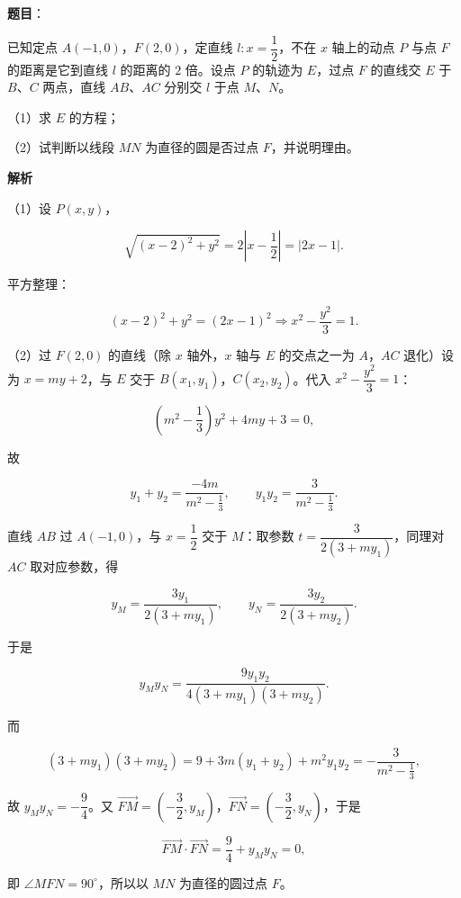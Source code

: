 \begin{answer}

\textbf{题目}：

已知定点 $A(-1,0)$，$F(2,0)$，定直线 $l:x=\dfrac12$，不在 $x$ 轴上的动点 $P$ 与点 $F$ 的距离是它到直线 $l$ 的距离的 $2$ 倍。设点 $P$ 的轨迹为 $E$，过点 $F$ 的直线交 $E$ 于 $B$、$C$ 两点，直线 $AB$、$AC$ 分别交 $l$ 于点 $M$、$N$。

（1）求 $E$ 的方程；

（2）试判断以线段 $MN$ 为直径的圆是否过点 $F$，并说明理由。

\textbf{解析}

（1）设 $P(x,y)$，

\nopagebreak[4]
\[\sqrt{(x-2)^2+y^2}=2\left|x-\frac12\right|=|2x-1|.\]

平方整理：

\nopagebreak[4]
\[(x-2)^2+y^2=(2x-1)^2
\Longrightarrow x^2-\frac{y^2}3=1.\]

（2）过 $F(2,0)$ 的直线（除 $x$ 轴外，$x$ 轴与 $E$ 的交点之一为 $A$，$AC$ 退化）设为 $x=my+2$，与 $E$ 交于 $B(x_1,y_1)$，$C(x_2,y_2)$。代入 $x^2-\dfrac{y^2}3=1$：

\nopagebreak[4]
\[\left(m^2-\frac13\right)y^2+4my+3=0,\]

故

\nopagebreak[4]
\[y_1+y_2=\frac{-4m}{m^2-\frac13},\qquad y_1y_2=\frac{3}{m^2-\frac13}.\]

直线 $AB$ 过 $A(-1,0)$，与 $x=\dfrac12$ 交于 $M$：取参数 $t=\dfrac{3}{2(3+my_1)}$，同理对 $AC$ 取对应参数，得

\nopagebreak[4]
\[y_M=\frac{3y_1}{2(3+my_1)},\qquad y_N=\frac{3y_2}{2(3+my_2)}.\]

于是

\nopagebreak[4]
\[y_My_N=\frac{9y_1y_2}{4(3+my_1)(3+my_2)}.\]

而

\nopagebreak[4]
\[(3+my_1)(3+my_2)=9+3m(y_1+y_2)+m^2y_1y_2=-\frac{3}{m^2-\frac13},\]

故 $y_My_N=-\dfrac94$。又 $\overrightarrow{FM}=\left(-\dfrac32,y_M\right)$，$\overrightarrow{FN}=\left(-\dfrac32,y_N\right)$，于是

\nopagebreak[4]
\[\overrightarrow{FM}\cdot\overrightarrow{FN}=\frac94+y_My_N=0,\]

即 $\angle MFN=90^\circ$，所以以 $MN$ 为直径的圆过点 $F$。


\end{answer}
